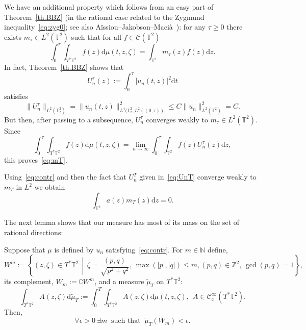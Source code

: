 \documentclass[AHL, Unicode, longabstracts]{cedram}
\newcommand{\CIc}{{\mathcal C}^\infty_{\mathrm{c}} }
\newcommand{\NN}{{\mathbb N}}
\newcommand{\TT}{{\mathbb T}}
\newcommand{\TT}{{\mathbb T}}
\newcommand*\Z{\mathbb Z}
\newcommand*{\dd}{\mathrm{d}}
\newcommand*{\dz}{\dd z}
\newcommand*{\dt}{\dd t}
\newcommand*{\dmu}{\dd \mu}
\newcommand*{\dwmu}{\dd \widetilde\mu}
\let\oldexists\exists
\renewcommand*{\exists}{\mathrel{\oldexists}}
\let\oldforall\forall
\renewcommand*{\forall}{\mathrel{\oldforall}}
\newcommand*{\Tq}{\,\middle|\,}
\begin{document}
We have an additional property which follows from an easy part of Theorem~\ref{th.BBZ} (in the rational case related to the Zygmund inequality~\eqref{eq:zyg0}; see also Aïssiou--Jakobson--Macià~\cite[Theorem~1.2]{AJM}): for any $ \tau \geq 0 $ there exists $ m_\tau
\in L^2 (\TT^2) $ such that for all $ f \in \mathcal C (\TT^2) $
\begin{equation}\label{eq:mT}
\int_{0}^\tau \!\!\int_{ T^* \TT^2 } f (z) \dmu (t, z, \zeta) =
\int_{\TT^2 } m_\tau (z) f (z) \dz.
\end{equation}
In fact, Theorem~\ref{th.BBZ} shows that
\begin{equation}\label{eq:UnT}
U_n^\tau (z) := \int_{0}^\tau | u_n (t, z) |^2 \dt
\end{equation}
satisfies
\begin{equation}\label{eq:prop22}
\| U^\tau_n \|_{ L^2 (\TT^2_z) } = \| u_n (t, z) \|_{ L^4 (\TT^2_z, L^2 ((0, \tau)) }^2 \leq C \| u_n \|_{L^2 (\TT^2) }^2 = C.
\end{equation}
But then, after passing to a subsequence, $ U_n^\tau $ converges weakly to $ m_\tau \in L^2 (\TT^2) $. Since
\[
\int_{0}^\tau \int_{ T^* \TT^2 } f (z) \dmu (t, z, \zeta) = \lim_{ n \to \infty } \int_{0}^\tau \int_{\TT^2} f (z) U_n^\tau (z) \dz,
\]
this proves~\eqref{eq:mT}.

Using~\eqref{eq:contr} and then the fact that $ U_n^T $ given in~\eqref{eq:UnT} converge weakly to $ m_T $ in $ L^2$ we obtain
\begin{equation}\label{eq:l1}
\int_{\TT^2 } a (z) m_T (z) \dz = 0.
\end{equation}

The next lemma shows that our measure has most of its mass on the set of rational directions:

\begin{lemm}\label{l:2}
Suppose that $\mu $ is defined by $ u_n$ satisfying~\eqref{eq:contr}. For $ m \in \NN $ define,
\[
W^m \!:=\! \left\{ (z, \zeta) \in T^* \TT^2 \Tq \zeta = \frac{ (p, q) }{
\sqrt{ p^2 + q^2 }}, \, \max(|p|, |q|) \leq m, (p, q) \in \Z^2, \, \gcd(p,q) = 1 \right\}\!,
\]
its complement, $ W_m := \complement W^m $, and a measure $ \widetilde \mu_T $ on $ T^* \TT^2 $:
\begin{equation}\label{eq:defwm}
\int_{T^* \TT^2} A (z, \zeta) \dwmu_T := \int_0^T \int_{T^* \TT^2 } A (z, \zeta) \dmu (t, z, \zeta), \ \ A \in \CIc (T^* \TT^2).
\end{equation}
Then,
\begin{equation}\label{eq:l2}
\forall \epsilon > 0 \ \exists m \ \text{ such that } \
\widetilde \mu_T (W_m) < \epsilon.
\end{equation}
\end{lemm}
\end{document}
